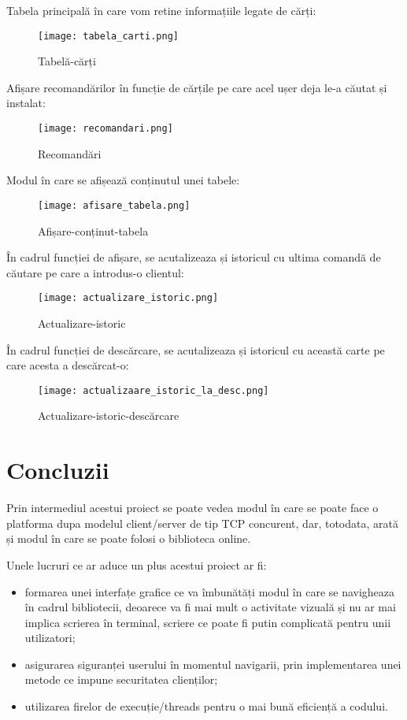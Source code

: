 \documentclass{article}
\begin{document}
Tabela principală în care vom retine informațiile legate de cărți:
\begin{figure}[h]
    \centering
    \texttt{[image: tabela\_carti.png]}
    \caption{Tabelă-cărți}
    \label{fig:enter-label}
\end{figure}

\clearpage

Afișare recomandărilor în funcție de cărțile pe care acel ușer deja le-a căutat și instalat: 
\begin{figure}[h]
    \centering
    \texttt{[image: recomandari.png]}
    \caption{Recomandări}
    \label{fig:enter-label}
\end{figure}
\clearpage

Modul în care se afișează conținutul unei tabele:
\begin{figure}[h]
    \centering
    \texttt{[image: afisare\_tabela.png]}
    \caption{Afișare-conținut-tabela}
    \label{fig:enter-label}
\end{figure}



În cadrul funcției de afișare, se acutalizeaza și istoricul cu ultima comandă de căutare pe care a introdus-o clientul: 
\begin{figure}[h]
    \centering
    \texttt{[image: actualizare\_istoric.png]}
    \caption{Actualizare-istoric}
    \label{fig:enter-label}
\end{figure}

În cadrul funcției de descărcare, se acutalizeaza și istoricul cu această carte pe care acesta a descărcat-o: 
\begin{figure}[h]
    \centering
    \texttt{[image: actualizaare\_istoric\_la\_desc.png]}
    \caption{Actualizare-istoric-descărcare}
    \label{fig:enter-label}
\end{figure}

\section{Concluzii}
    \hspace{0.5cm}Prin intermediul acestui proiect se poate vedea modul în care se poate face o platforma dupa modelul client/server de tip TCP concurent, dar, totodata, arată și modul în care se poate folosi o biblioteca online.
    
    Unele lucruri ce ar aduce un plus acestui proiect ar fi:
\begin{itemize}
    \item formarea unei interfațe grafice ce va îmbunătăți modul în care se navigheaza în cadrul bibliotecii, deoarece va fi mai mult o activitate vizuală și nu ar mai implica scrierea în terminal, scriere ce poate fi putin complicată pentru unii utilizatori;
    \item asigurarea siguranței userului în momentul navigarii, prin implementarea unei metode ce impune securitatea clienților;
    \item utilizarea firelor de execuție/threads pentru o mai bună eficiență a codului.
\end{itemize}
\end{document}
